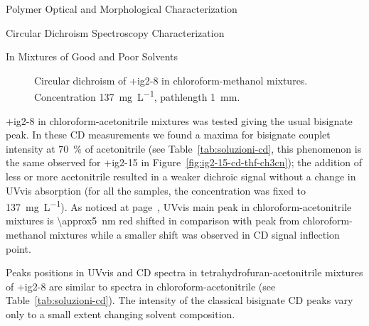 \begin{section}{Polymer Optical and Morphological Characterization}
\begin{subsection}{Circular Dichroism Spectroscopy Characterization}
\begin{subsubsection}{In Mixtures of Good and Poor Solvents}
\begin{figure}[tbp]%
 \caption[Circular dichroism of \cmpd+{ig2-8} in chloro\-form-methanol mixtures.]{Circular dichroism of \cmpd+{ig2-8} in chloro\-form-methanol mixtures. Concentration \SI{137}{\mg\per\liter}, pathlength \SI{1}{\mm}.}
\label{fig:ig2-8-cd-meoh-2}
\end{figure}

\cmpd+{ig2-8} in chloro\-form-aceto\-nitrile mixtures was tested giving the usual bisignate peak. In these \gls{CD} measurements we found a maxima for bisignate couplet intensity at 70~\% of acetonitrile (see Table~\ref{tab:soluzioni-cd}, this phenomenon is the same observed for \cmpd+{ig2-15} in Figure~\ref{fig:ig2-15-cd-thf-ch3cn}); the addition of less or more acetonitrile resulted in a weaker dichroic signal without a change in \gls{UVvis} absorption (for all the samples, the concentration was fixed to \SI{137}{\mg\per\liter}). 
As noticed at page~\pageref{uvvis-ch3cn}, \gls{UVvis} main peak in chloro\-form-aceto\-nitrile mixtures is \SI{\approx5}{\nm} red shifted in comparison with peak from chloro\-form-methanol mixtures while a smaller shift was observed in \gls{CD} signal inflection point.

Peaks positions in \gls{UVvis} and \gls{CD} spectra in tetra\-hydro\-furan-aceto\-nitrile mixtures of \cmpd+{ig2-8} are similar to spectra in chloro\-form-aceto\-nitrile (see Table~\ref{tab:soluzioni-cd}). The intensity of the classical bisignate \gls{CD} peaks vary only to a small extent changing solvent composition.


\end{subsubsection}
\end{subsection}
\end{section}
